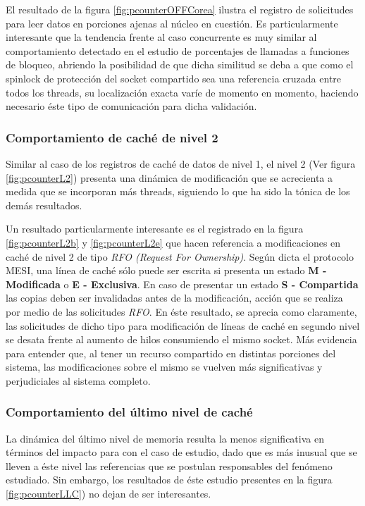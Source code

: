 El resultado de la figura \ref{fig:pcounterOFFCorea} ilustra el registro de solicitudes para leer datos en porciones ajenas al núcleo en cuestión. Es particularmente interesante que la tendencia frente al caso concurrente es muy similar al comportamiento detectado en el estudio de porcentajes de llamadas a funciones de bloqueo, abriendo la posibilidad de que dicha similitud se deba a que como el spinlock de protección del socket compartido sea una referencia cruzada entre todos los threads, su localización exacta varíe de momento en momento, haciendo necesario éste tipo de comunicación para dicha validación.

\subsubsection{Comportamiento de caché de nivel 2}
Similar al caso de los registros de caché de datos de nivel 1, el nivel 2 (Ver figura \ref{fig:pcounterL2}) presenta una dinámica de modificación que se acrecienta a medida que se incorporan más threads, siguiendo lo que ha sido la tónica de los demás resultados.

Un resultado particularmente interesante es el registrado en la figura \ref{fig:pcounterL2b} y \ref{fig:pcounterL2e} que hacen referencia a modificaciones en caché de nivel 2 de tipo \emph{RFO (Request For Ownership)}. Según dicta el protocolo MESI, una línea de caché sólo puede ser escrita si presenta un estado \textbf{M - Modificada} o \textbf{E - Exclusiva}. En caso de presentar un estado \textbf{S - Compartida} las copias deben ser invalidadas antes de la modificación, acción que se realiza por medio de las solicitudes \emph{RFO}. En éste resultado, se aprecia como claramente, las solicitudes de dicho tipo para modificación de líneas de caché en segundo nivel se desata frente al aumento de hilos consumiendo el mismo socket. Más evidencia para entender que, al tener un recurso compartido en distintas porciones del sistema, las modificaciones sobre el mismo se vuelven más significativas y perjudiciales al sistema completo.

\subsubsection{Comportamiento del último nivel de caché}
La dinámica del último nivel de memoria resulta la menos significativa en términos del impacto para con el caso de estudio, dado que es más inusual que se lleven a éste nivel las referencias que se postulan responsables del fenómeno estudiado. Sin embargo, los resultados de éste estudio presentes en la figura \ref{fig:pcounterLLC}) no dejan de ser interesantes.

